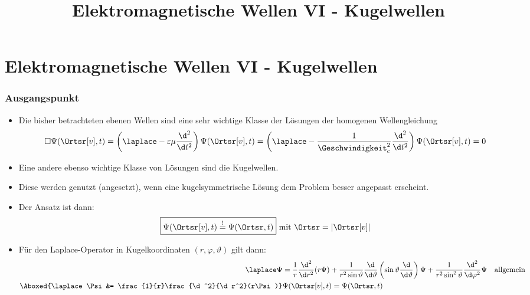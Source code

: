 
  
\title[TET: Elektromagnetische Wellen VI - Kugelwellen]{Elektromagnetische Wellen VI - Kugelwellen}


% 
% 

\maketitle

% 
% 
\section{Elektromagnetische Wellen VI - Kugelwellen}

\begin{frame}
  \frametitle{Ausgangspunkt}
  \begin{itemize}[<+->]
  \item Die bisher betrachteten \alert{ebenen Wellen} sind eine sehr wichtige Klasse der Lösungen der \alert{homogenen Wellengleichung}
    \begin{equation*}
      \square\Psi(\Ortsr[v],t) = \left(\laplace - \varepsilon\mu\frac{\d^2}{\d t^2}\right)\Psi(\Ortsr[v],t) = \left(\laplace - \frac{1}{\Geschwindigkeit_c^2}\frac{\d^2}{\d t^2}\right)\Psi(\Ortsr[v],t) = 0
    \end{equation*}
  \item Eine andere ebenso wichtige Klasse von Lösungen sind die \alert{Kugelwellen}.
  \item Diese werden genutzt (angesetzt), wenn eine \alert{kugelsymmetrische Lösung} dem Problem besser angepasst erscheint.
  \item Der \alert{Ansatz} ist dann:
    \begin{equation*}
      \boxed{\Psi(\Ortsr[v],t) \stackrel{!}{=} \Psi(\Ortsr,t)} \text{ mit } \Ortsr = |\Ortsr[v]|
    \end{equation*}
  \item Für den \alert{Laplace-Operator} in \alert{Kugelkoordinaten} \((r,\varphi,\vartheta)\) gilt dann:
    \begin{align*}
      \laplace \Psi &= \frac{1}{r} \frac{\d^2}{\d r^2}(r\Psi) + \frac{1}{r^2\sin\vartheta} \frac{\d}{\d\vartheta} \left(\sin\vartheta\frac{\d}{\d \vartheta}\right)\Psi + \frac{1}{r^2\sin^2\vartheta}\frac{\d^2}{\d \varphi^2}\Psi &\text{allgemein}\\
      \Aboxed{\laplace \Psi&= \frac{1}{r}\frac{\d^2}{\d r^2}(r\Psi)} & \Psi(\Ortsr[v],t) = \Psi(\Ortsr,t)
      \end{align*}
  \end{itemize}
  \end{frame}

